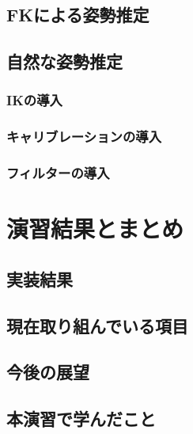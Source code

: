 \documentclass[a4j]{jsarticle}
\begin{document}
\subsection{FKによる姿勢推定}

\subsection{自然な姿勢推定}

\subsubsection{IKの導入}

\subsubsection{キャリブレーションの導入}

\subsubsection{フィルターの導入}

\section{演習結果とまとめ}

\subsection{実装結果}

\subsection{現在取り組んでいる項目}

\subsection{今後の展望}

\subsection{本演習で学んだこと}
\end{document}
